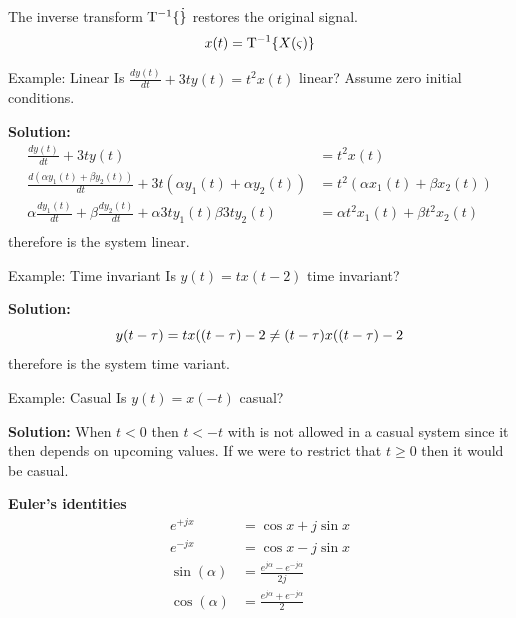 The inverse transform $\mathrm{T}^{-1}\{ \dot \}$ restores the original signal.
\begin{equation*}
    x(t) = \mathrm{T}^{-1}\{ X(\varsigma) \}
\end{equation*}

\begin{exampleblock}{Example: Linear}
Is $\frac{dy(t)}{dt}+3ty(t)=t^2x(t)$ linear? Assume zero initial conditions.

\textbf{Solution:}
\begin{align*}
    \frac{dy(t)}{dt}+3ty(t) &= t^2x(t) \\
    \frac{d(\alpha y_1(t) + \beta y_2(t))}{dt} + 3t(\alpha y_1(t) + \alpha y_2(t)) &= t^2(\alpha x_1(t) + \beta x_2(t)) \\
    \alpha\frac{dy_1(t)}{dt} + \beta\frac{dy_2(t)}{dt} + \alpha 3ty_1(t) \beta 3ty_2(t) &= \alpha t^2 x_1(t) + \beta t^2 x_2(t) \\
\end{align*}
therefore is the system linear.
\end{exampleblock}


\begin{exampleblock}{Example: Time invariant}
Is $y(t)=tx(t-2)$ time invariant? 

\textbf{Solution:}
\begin{equation*}
    y(t-\tau) = tx((t-\tau)-2 \neq (t-\tau)x((t-\tau)-2 \\
\end{equation*}
therefore is the system time variant.
\end{exampleblock}

\vspace{1cm}
\begin{exampleblock}{Example: Casual}
Is $y(t)=x(-t)$ casual? 

\textbf{Solution:}
When $t<0$ then $t<-t$ with is not allowed in a casual system since it then depends on
upcoming values. If we were to restrict that $t\geq0$ then it would be casual.
\end{exampleblock}


\noindent\textbf{Euler's identities}
\begin{align*}
  e^{+jx} &= \cos{x} + j\sin{x} \\
  e^{-jx} &= \cos{x} - j\sin{x} \\
  \sin(\alpha) &= \frac{e^{j\alpha}-e^{-j\alpha}}{2j} \\
  \cos(\alpha) &= \frac{e^{j\alpha}+e^{-j\alpha}}{2}
\end{align*}

